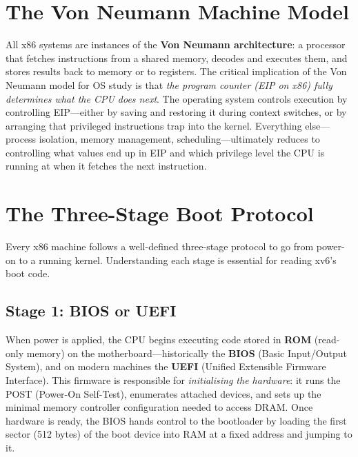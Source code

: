 \documentclass[11pt]{article}
\begin{document}
\section{The Von Neumann Machine Model}

All x86 systems are instances of the \textbf{Von Neumann architecture}: a processor that
fetches instructions from a shared memory, decodes and executes them, and stores results back
to memory or to registers. The critical implication of the Von Neumann model for OS study is
that \emph{the program counter (EIP on x86) fully determines what the CPU does next}. The
operating system controls execution by controlling EIP---either by saving and restoring it
during context switches, or by arranging that privileged instructions trap into the kernel.
Everything else---process isolation, memory management, scheduling---ultimately reduces to
controlling what values end up in EIP and which privilege level the CPU is running at when
it fetches the next instruction.

\section{The Three-Stage Boot Protocol}

Every x86 machine follows a well-defined three-stage protocol to go from power-on to a running
kernel. Understanding each stage is essential for reading xv6's boot code.

\subsection{Stage 1: BIOS or UEFI}

When power is applied, the CPU begins executing code stored in \textbf{ROM}
(read-only memory) on the motherboard---historically the \textbf{BIOS} (Basic Input/Output
System), and on modern machines the \textbf{UEFI} (Unified Extensible Firmware Interface).
This firmware is responsible for \emph{initialising the hardware}: it runs the POST (Power-On
Self-Test), enumerates attached devices, and sets up the minimal memory controller
configuration needed to access DRAM. Once hardware is ready, the BIOS hands control to the
bootloader by loading the first sector (512 bytes) of the boot device into RAM at a fixed
address and jumping to it.
\end{document}
